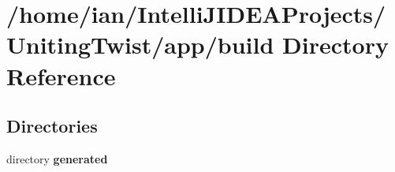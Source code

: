 \section{/home/ian/\+Intelli\+J\+I\+D\+E\+A\+Projects/\+Uniting\+Twist/app/build Directory Reference}
\label{dir_4b7913ac168dd86d6e8071e4e7ea4375}
\subsection*{Directories}
\begin{DoxyCompactItemize}
\item 
directory \textbf{ generated}
\end{DoxyCompactItemize}
